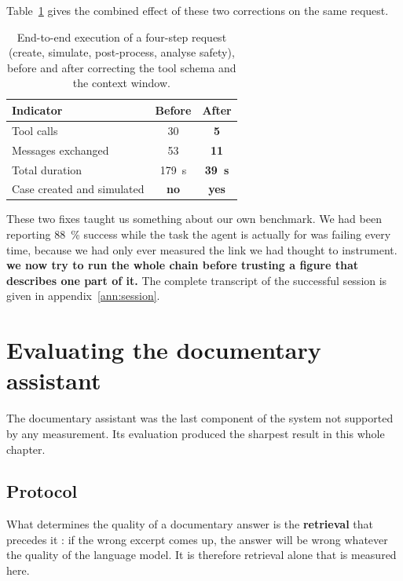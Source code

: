 Table~\ref{tab:bout-en-bout} gives the combined effect of these two corrections
on the same request.

\begin{table}[htbp]
\centering
\caption[End-to-end execution]{End-to-end execution of a four-step request
(create, simulate, post-process, analyse safety), before and after correcting
the tool schema and the context window.}
\label{tab:bout-en-bout}
\begin{tabularx}{0.92\textwidth}{@{}Xcc@{}}
\toprule
\textbf{Indicator} & \textbf{Before} & \textbf{After}\\
\midrule
Tool calls & \num{30} & \textbf{\num{5}}\\
Messages exchanged & \num{53} & \textbf{\num{11}}\\
Total duration & \SI{179}{\second} & \textbf{\SI{39}{\second}}\\
Case created and simulated & \textcolor{cAlert}{\textbf{no}} & \textbf{yes}\\
\bottomrule
\end{tabularx}
\end{table}

These two fixes taught us something about our own benchmark. We had been
reporting \SI{88}{\percent} success while the task the agent is actually for was
failing every time, because we had only ever measured the link we had thought to
instrument. \textbf{we now try to run the whole chain before trusting a figure
that describes one part of it.} The complete transcript of
the successful session is given in appendix~\ref{ann:session}.

\section{Evaluating the documentary assistant}
\label{sec:rag}

The documentary assistant was the last component of the system not supported by
any measurement. Its evaluation produced the sharpest result in this whole
chapter.

\subsection{Protocol}

What determines the quality of a documentary answer is the \textbf{retrieval}
that precedes it : if the wrong excerpt comes up, the answer will be wrong
whatever the quality of the language model. It is therefore retrieval alone that
is measured here.

